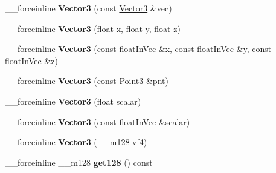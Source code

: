 \begin{DoxyCompactItemize}
\item 
\hypertarget{classVectormath_1_1Aos_1_1Vector3_aa19977a8f22c28bb7fde8ce0eef51ac4}{\-\_\-\-\_\-forceinline {\bfseries Vector3} (const \hyperlink{classVectormath_1_1Aos_1_1Vector3}{Vector3} \&vec)}\label{classVectormath_1_1Aos_1_1Vector3_aa19977a8f22c28bb7fde8ce0eef51ac4}

\item 
\hypertarget{classVectormath_1_1Aos_1_1Vector3_afdc94668060aaeb330502e69aa6d7a74}{\-\_\-\-\_\-forceinline {\bfseries Vector3} (float x, float y, float z)}\label{classVectormath_1_1Aos_1_1Vector3_afdc94668060aaeb330502e69aa6d7a74}

\item 
\hypertarget{classVectormath_1_1Aos_1_1Vector3_aa3958b506883e1218efeb8a5cdef7788}{\-\_\-\-\_\-forceinline {\bfseries Vector3} (const \hyperlink{classVectormath_1_1floatInVec}{float\-In\-Vec} \&x, const \hyperlink{classVectormath_1_1floatInVec}{float\-In\-Vec} \&y, const \hyperlink{classVectormath_1_1floatInVec}{float\-In\-Vec} \&z)}\label{classVectormath_1_1Aos_1_1Vector3_aa3958b506883e1218efeb8a5cdef7788}

\item 
\hypertarget{classVectormath_1_1Aos_1_1Vector3_a62006eb6671f4bcc3a95060e6af88368}{\-\_\-\-\_\-forceinline {\bfseries Vector3} (const \hyperlink{classVectormath_1_1Aos_1_1Point3}{Point3} \&pnt)}\label{classVectormath_1_1Aos_1_1Vector3_a62006eb6671f4bcc3a95060e6af88368}

\item 
\hypertarget{classVectormath_1_1Aos_1_1Vector3_a71c6e33bbbd6cd3e3c93b08f3f29abb0}{\-\_\-\-\_\-forceinline {\bfseries Vector3} (float scalar)}\label{classVectormath_1_1Aos_1_1Vector3_a71c6e33bbbd6cd3e3c93b08f3f29abb0}

\item 
\hypertarget{classVectormath_1_1Aos_1_1Vector3_ac45834f3587a3b3f6c287d9dd2fadaca}{\-\_\-\-\_\-forceinline {\bfseries Vector3} (const \hyperlink{classVectormath_1_1floatInVec}{float\-In\-Vec} \&scalar)}\label{classVectormath_1_1Aos_1_1Vector3_ac45834f3587a3b3f6c287d9dd2fadaca}

\item 
\hypertarget{classVectormath_1_1Aos_1_1Vector3_a21421e4d7d15c9b5ce6f7f630447cb89}{\-\_\-\-\_\-forceinline {\bfseries Vector3} (\-\_\-\-\_\-m128 vf4)}\label{classVectormath_1_1Aos_1_1Vector3_a21421e4d7d15c9b5ce6f7f630447cb89}

\item 
\hypertarget{classVectormath_1_1Aos_1_1Vector3_acd4ea69340ca89b06f65fc6713ebefa1}{\-\_\-\-\_\-forceinline \-\_\-\-\_\-m128 {\bfseries get128} () const }\label{classVectormath_1_1Aos_1_1Vector3_acd4ea69340ca89b06f65fc6713ebefa1}


\end{DoxyCompactItemize}
